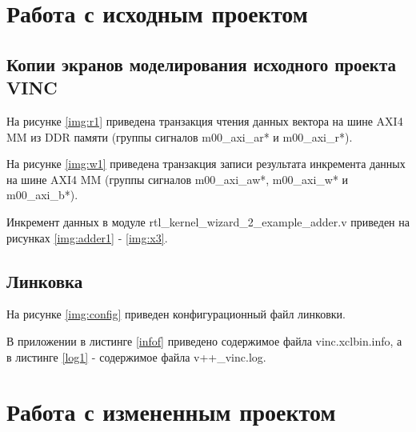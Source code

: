 \chapter{Работа с исходным проектом}


\section{Копии экранов моделирования исходного проекта VINC}

На рисунке \ref{img:r1} приведена транзакция чтения данных вектора на шине AXI4 MM из DDR памяти (группы сигналов m00\_axi\_ar* и m00\_axi\_r*).


На рисунке \ref{img:w1} приведена транзакция записи результата инкремента данных на шине AXI4 MM (группы сигналов m00\_axi\_aw*, m00\_axi\_w* и m00\_axi\_b*).


	
Инкремент данных в модуле  rtl\_kernel\_wizard\_2\_example\_adder.v приведен на рисунках \ref{img:adder1} - \ref{img:x3}.

\clearpage
{}



\section{Линковка}

На рисунке \ref{img:config} приведен конфигурационный файл линковки.




В приложении в листинге \ref{infof} приведено содержимое файла vinc.xclbin.info, а в листинге \ref{log1} - содержимое файла v++\_vinc.log.



\chapter{Работа с измененным проектом}


